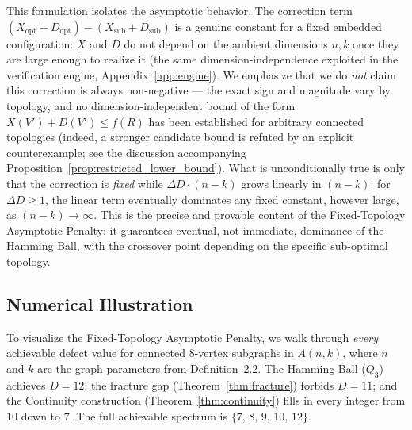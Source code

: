 This formulation isolates the asymptotic behavior. The correction term
$(X_{\mathrm{opt}} + D_{\mathrm{opt}}) - (X_{\mathrm{sub}} + D_{\mathrm{sub}})$
is a genuine constant for a fixed embedded configuration: $X$ and $D$ do not
depend on the ambient dimensions
$n, k$ once they are large enough to realize it (the same dimension-independence
exploited in the verification engine, Appendix~\ref{app:engine}). We emphasize
that we do \emph{not} claim this correction is always non-negative --- the exact
sign and magnitude vary by topology, and no dimension-independent bound of the
form $X(V')+D(V') \le f(R)$ has been established for arbitrary connected
topologies (indeed, a stronger candidate bound is refuted by an
explicit counterexample; see the discussion accompanying
Proposition~\ref{prop:restricted_lower_bound}). What is unconditionally true is only that the
correction is \emph{fixed} while $\Delta D \cdot (n-k)$ grows linearly in
$(n-k)$: for $\Delta D \ge 1$, the linear term eventually dominates any fixed
constant, however large, as $(n-k) \to \infty$. This is the precise and provable
content of the Fixed-Topology Asymptotic Penalty: it guarantees eventual, not
immediate, dominance of the Hamming Ball, with the crossover point depending on
the specific sub-optimal topology.

\subsection{Numerical Illustration}

To visualize the Fixed-Topology Asymptotic Penalty, we walk through \emph{every}
achievable defect value for connected $8$-vertex subgraphs in $A(n,k)$, where
$n$ and $k$ are the graph parameters from Definition~2.2. The Hamming Ball
($Q_3$) achieves $D = 12$; the fracture gap (Theorem~\ref{thm:fracture}) forbids
$D = 11$; and the Continuity construction (Theorem~\ref{thm:continuity}) fills
in every integer from $10$ down to $7$. The full achievable spectrum is $\{7,\,
8,\, 9,\, 10,\, 12\}$.

